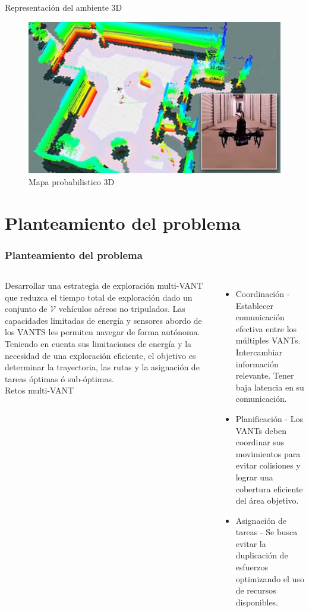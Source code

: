 \documentclass[
	12pt, %
	aspectratio=169, %
]{beamer}
\begin{document}
\begin{frame}{Representación del ambiente 3D}
  \begin{figure}
    \centering
    \includegraphics[scale=0.15]{drone_mapping}
    \caption[Caption for LOF]{Mapa probabilistico 3D\protect\footnotemark}
  \end{figure}
  
\end{frame}

\section{Planteamiento del problema}

\begin{frame}
  \frametitle{Planteamiento del problema}
  \begin{columns}
    \justifying
    \small Desarrollar una estrategia de exploración multi-VANT que reduzca el tiempo total de exploración dado un conjunto de $\mathcal{V}$ vehículos aéreos no tripulados. Las capacidades limitadas de energía y sensores abordo de los VANTS les permiten navegar de forma autónoma. Teniendo en cuenta sus limitaciones de energía y la necesidad de una exploración eficiente, el objetivo es determinar la trayectoria, las rutas y la asignación de tareas óptimas ó sub-óptimas.
    \\
    \pause
    \centering
    \small Retos multi-VANT
    \begin{itemize}
    \small \item Coordinación - Establecer comunicación efectiva entre los múltiples VANTs. Intercambiar información relevante. Tener baja latencia en su comunicación.
    \small \item Planificación - Los VANTs deben coordinar sus movimientos para evitar colisiones y lograr una cobertura eficiente del área objetivo.
    \small \item Asignación de tareas - Se busca evitar la duplicación de esfuerzos optimizando el uso de recursos disponibles.
    \end{itemize}
  \end{columns}
\end{frame}
\end{document}
